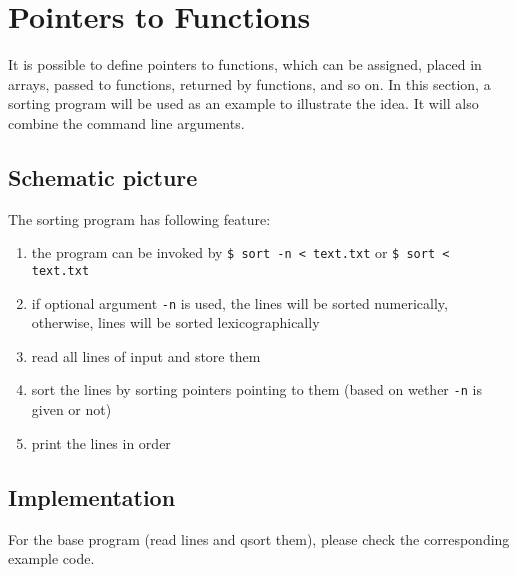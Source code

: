 \documentclass[12pt]{article}
\begin{document}
\section{Pointers to Functions}
\label{sec:org7b7faaf}
It is possible to define pointers to functions, which can be assigned, placed in arrays, passed to functions, returned by functions, and so on. In this section, a sorting program will be used as an example to illustrate the idea. It will also combine the command line arguments.

\subsection{Schematic picture}
\label{sec:org3eff501}
The sorting program has following feature:
\begin{enumerate}
\item the program can be invoked by \texttt{\$ sort -n < text.txt} or \texttt{\$ sort < text.txt}
\item if optional argument \texttt{-n} is used, the lines will be sorted numerically, otherwise, lines will be sorted lexicographically
\item read all lines of input and store them
\item sort the lines by sorting pointers pointing to them (based on wether \texttt{-n} is given or not)
\item print the lines in order
\end{enumerate}


\subsection{Implementation}
\label{sec:orgad64327}
For the base program (read lines and qsort them), please check the corresponding example code.
\end{document}
